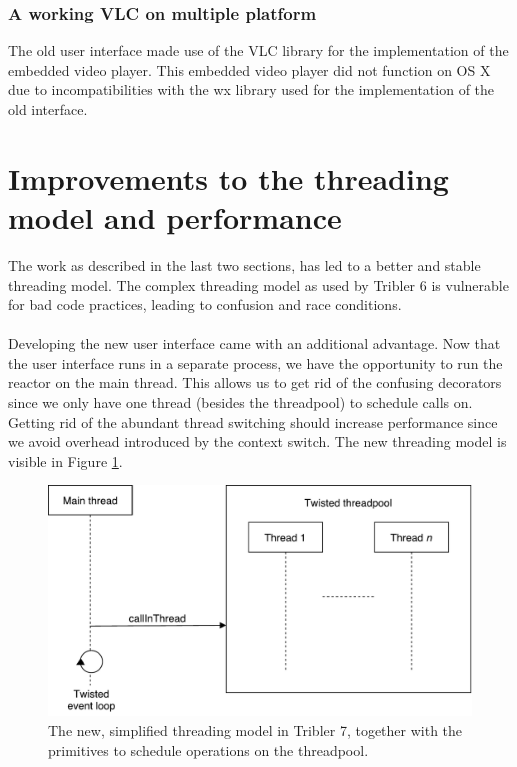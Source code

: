 \subsubsection{\textbf{A working VLC on multiple platform}}
The old user interface made use of the VLC library for the implementation of the embedded video player. This embedded video player did not function on OS X due to incompatibilities with the wx library used for the implementation of the old interface.

\section{Improvements to the threading model and performance}
The work as described in the last two sections, has led to a better and stable threading model. The complex threading model as used by Tribler 6 is vulnerable for bad code practices, leading to confusion and race conditions.\\\\
Developing the new user interface came with an additional advantage. Now that the user interface runs in a separate process, we have the opportunity to run the reactor on the main thread. This allows us to get rid of the confusing decorators since we only have one thread (besides the threadpool) to schedule calls on. Getting rid of the abundant thread switching should increase performance since we avoid overhead introduced by the context switch. The new threading model is visible in Figure \ref{fig:new-threading-model}.

\begin{figure}[h!]
	\centering
	\includegraphics[width=0.7\columnwidth]{images/improving_qa/new_threading_model_tribler}
	\caption{The new, simplified threading model in Tribler 7, together with the primitives to schedule operations on the threadpool.}
	\label{fig:new-threading-model}
\end{figure}

